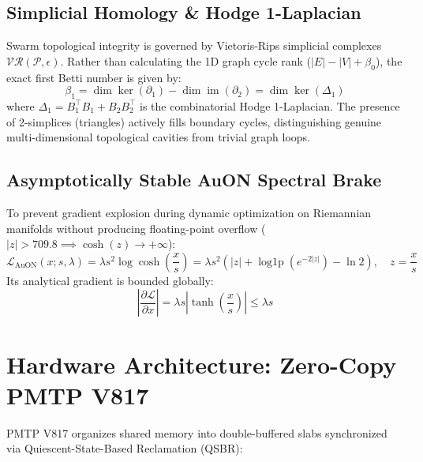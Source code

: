 \documentclass[11pt,twoside,a4paper]{article}
\theoremstyle{plain}
\theoremstyle{definition}
\theoremstyle{remark}
\begin{document}
\subsection{Simplicial Homology & Hodge 1-Laplacian}

Swarm topological integrity is governed by Vietoris-Rips simplicial complexes $\mathcal{VR}(\mathcal{P}, \epsilon)$. Rather than calculating the 1D graph cycle rank ($|E| - |V| + \beta_0$), the exact first Betti number is given by:
\begin{equation}
\beta_1 = \dim\ker(\partial_1) - \dim\operatorname{im}(\partial_2) = \dim\ker(\Delta_1)
\end{equation}
where $\Delta_1 = B_1^\top B_1 + B_2 B_2^\top$ is the combinatorial Hodge 1-Laplacian. The presence of 2-simplices (triangles) actively fills boundary cycles, distinguishing genuine multi-dimensional topological cavities from trivial graph loops.

\subsection{Asymptotically Stable AuON Spectral Brake}

To prevent gradient explosion during dynamic optimization on Riemannian manifolds without producing floating-point overflow ($|z| > 709.8 \implies \cosh(z) \to +\infty$):
\begin{equation}
\mathcal{L}_{\text{AuON}}(x; s, \lambda) = \lambda s^2 \log\cosh\left(\frac{x}{s}\right) = \lambda s^2 \left( |z| + \operatorname{log1p}\left(e^{-2|z|}\right) - \ln 2 \right), \quad z = \frac{x}{s}
\end{equation}
Its analytical gradient is bounded globally:
\begin{equation}
\left| \frac{\partial \mathcal{L}}{\partial x} \right| = \lambda s \left| \tanh\left(\frac{x}{s}\right) \right| \le \lambda s
\end{equation}

\section{Hardware Architecture: Zero-Copy PMTP V817}
\label{sec:pmtp}

PMTP V817 organizes shared memory into double-buffered slabs synchronized via Quiescent-State-Based Reclamation (QSBR):
\end{document}
